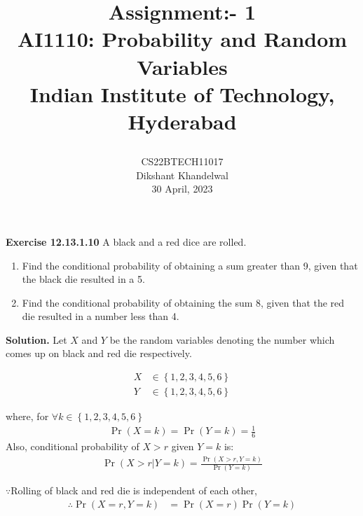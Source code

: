 \documentclass[journal,12pt,twocolumn]{IEEEtran}
\title{

  Assignment:- 1\\
  \Large AI1110: Probability and Random Variables\\
  \Large Indian Institute of Technology, Hyderabad
}
\author{
  CS22BTECH11017\\[4pt]
  Dikshant Khandelwal\\
  30 April, 2023
}
\providecommand{\pr}[1]{\ensuremath{\Pr\left(#1\right)}}
\providecommand{\cbrak}[1]{\ensuremath{\left\{#1\right\}}}
\theoremstyle{remark}
\begin{document}
%

\maketitle

\textbf{Exercise 12.13.1.10} A black and a red dice are rolled.
\begin{enumerate}[label=(\alph*)]
    \item Find the conditional probability of obtaining a sum greater than 9, given
that the black die resulted in a 5.
    \item Find the conditional probability of obtaining the sum 8, given that the red die
resulted in a number less than 4.
\end{enumerate}

\textbf{Solution.} Let $X$ and $Y$ be the random variables denoting the number which comes up on black and red die respectively.

\begin{align}
    X &\in \cbrak{1, 2, 3, 4, 5, 6}\\
    Y &\in \cbrak{1, 2, 3, 4, 5, 6}
\end{align}

where, for $\forall k \in \cbrak{1, 2, 3, 4, 5, 6}$
\begin{align}
    \pr{X=k} = \pr{Y =k} = \frac{1}{6}
\end{align}
Also, conditional probability of $X>r$ given 
$Y= k$  is:
\begin{align}
    \pr{X>r | Y=k} = \frac{\pr{X>r, Y=k}}{\pr{Y=k}}
\end{align}

$\because$Rolling of black and red die is independent of each other,
\begin{align}
    \therefore \label{eq2}\pr{X=r , Y=k} &= \pr{X=r}\pr{Y= k}
\end{align}
\end{document}
